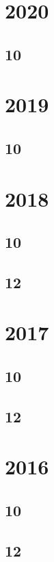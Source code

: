 \section{2020}
\subsection{10}

\section{2019}
\subsection{10}

\section{2018}
\subsection{10}


\subsection{12}



\section{2017}
\subsection{10}

\subsection{12}




\section{2016}
\subsection{10}

\subsection{12}


